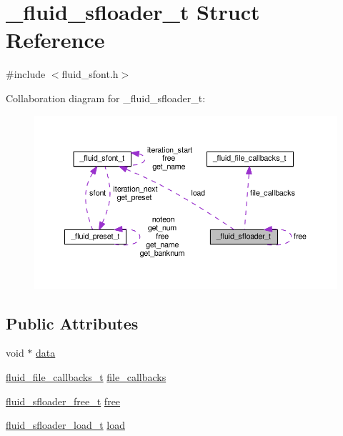 \hypertarget{struct__fluid__sfloader__t}{}\section{\+\_\+fluid\+\_\+sfloader\+\_\+t Struct Reference}
\label{struct__fluid__sfloader__t}


{\ttfamily \#include $<$fluid\+\_\+sfont.\+h$>$}



Collaboration diagram for \+\_\+fluid\+\_\+sfloader\+\_\+t\+:
\nopagebreak
\begin{figure}[H]
\begin{center}
\leavevmode
\includegraphics[width=350pt]{struct__fluid__sfloader__t__coll__graph}
\end{center}
\end{figure}
\subsection*{Public Attributes}
\begin{DoxyCompactItemize}
\item 
void $\ast$ \hyperlink{struct__fluid__sfloader__t_a128547f2341db8c9f5ddb0158d1d4235}{data}
\item 
\hyperlink{types_8h_a6a223e4b8d83753d95c87e1feed58227}{fluid\+\_\+file\+\_\+callbacks\+\_\+t} \hyperlink{struct__fluid__sfloader__t_a03d8c51a7b64dd670899f6affaa43805}{file\+\_\+callbacks}
\item 
\hyperlink{sfont_8h_aab801ff11ddf556d3f34e82c2ca02897}{fluid\+\_\+sfloader\+\_\+free\+\_\+t} \hyperlink{struct__fluid__sfloader__t_a00c9b284ca7894da330b306ab091ed14}{free}
\item 
\hyperlink{sfont_8h_a4fce6413dd211799ce9716fe1b56b635}{fluid\+\_\+sfloader\+\_\+load\+\_\+t} \hyperlink{struct__fluid__sfloader__t_ad0c3fd755c8c9a4333e7d0a15f50844f}{load}
\end{DoxyCompactItemize}


